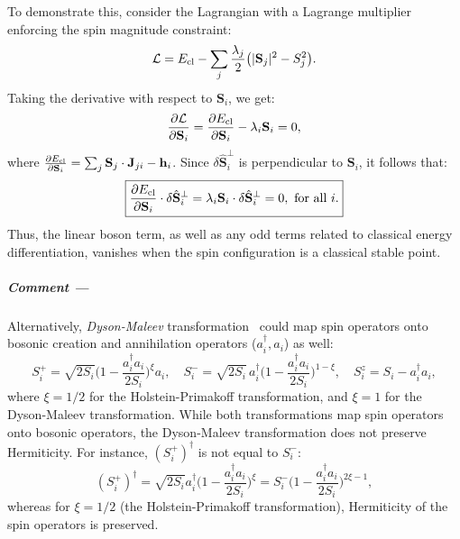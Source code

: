 \documentclass[aps, prx, nofootinbib, superscriptaddress]{revtex4-2}
\begin{document}
To demonstrate this, consider the Lagrangian with a Lagrange multiplier enforcing the spin magnitude constraint:
\begin{equation}
    \mathcal{L} = E_{\rm cl} - \sum_{j} \frac{\lambda_{j}}{2} \big( |\mathbf{S}_{j}|^{2} - S_{j}^{2} \big).
\end{equation}
Taking the derivative with respect to $\mathbf{S}_{i}$, we get:
\begin{equation}
    \frac{\partial \mathcal{L}}{\partial \mathbf{S}_{i}} = \frac{\partial E_{\rm cl}}{\partial \mathbf{S}_{i}} - \lambda_{i} \mathbf{S}_{i} = 0,
\end{equation}
where $\frac{\partial E_{\rm cl}}{\partial \mathbf{S}_{i}} = \sum_{j} \mathbf{S}_{j} \cdot \mathbf{J}_{ji} - \mathbf{h}_{i}$. 
Since $\delta \hat{\mathbf{S}}_{i}^{\perp}$ is perpendicular to $\mathbf{S}_{i}$, it follows that:
\begin{equation}
    \boxed{\frac{\partial E_{\rm cl}}{\partial \mathbf{S}_{i}} \cdot \delta \hat{\mathbf{S}}_{i}^{\perp} = \lambda_{i} \mathbf{S}_{i} \cdot \delta \hat{\mathbf{S}}_{i}^{\perp} = 0, \text{ for all } i.} 
\end{equation}
Thus, the linear boson term, as well as any odd terms related to classical energy differentiation, vanishes when the spin configuration is a classical stable point.


\subparagraph{Comment ---}
Alternatively, \emph{Dyson-Maleev} transformation~\cite{PhysRev.102.1217, maleev1958scattering} could map spin operators onto bosonic creation and annihilation operators ($a_{i}^{\dagger}, a_{i}$) as well:
\begin{equation}\label{eq: spin-to-boson mapping}
        S^{+}_{i} = \sqrt{2S_{i}} \Big( 1 - \frac{a^{\dagger}_{i}a_{i}}{2S_{i}} \Big)^{\xi} a_{i}, \quad
        S^{-}_{i} = \sqrt{2S_{i}} \, a_{i}^{\dagger} \Big( 1 - \frac{a^{\dagger}_{i}a_{i}}{2S_{i}} \Big)^{1 - \xi}, \quad
        S_{i}^{z} = S_{i} - a^{\dagger}_{i} a_{i},
\end{equation}
where $\xi = 1/2$ for the Holstein-Primakoff transformation, and $\xi = 1$ for the Dyson-Maleev transformation. 
While both transformations map spin operators onto bosonic operators, the Dyson-Maleev transformation does not preserve Hermiticity. For instance, $(S^{+}_{i})^{\dagger}$ is not equal to $S^{-}_{i}$:
\begin{equation}
        (S^{+}_{i})^{\dagger} = \sqrt{2S_{i}} a^{\dagger}_{i} \Big( 1 - \frac{a^{\dagger}_{i} a_{i}}{2S_{i}} \Big)^{\xi} = S^{-}_{i} \Big( 1 - \frac{a^{\dagger}_{i} a_{i}}{2S_{i}} \Big)^{2\xi - 1},
\end{equation}
whereas for $\xi = 1/2$ (the Holstein-Primakoff transformation), Hermiticity of the spin operators is preserved.
\end{document}
